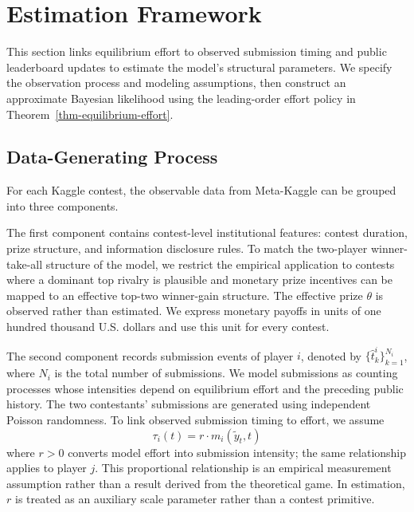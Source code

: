 \documentclass[mnsc]{informs3}
\begin{document}
\section{Estimation Framework}\label{sect-bayes-framework}

This section links equilibrium effort to observed submission timing and public leaderboard updates to estimate the model's structural parameters. We specify the observation process and modeling assumptions, then construct an approximate Bayesian likelihood using the leading-order effort policy in Theorem~\ref{thm-equilibrium-effort}.

\subsection{Data-Generating Process}

For each Kaggle contest, the observable data from Meta-Kaggle can be grouped into three components.

The first component contains contest-level institutional features: contest duration, prize structure, and information disclosure rules.
To match the two-player winner-take-all structure of the model, we restrict the empirical application to contests where a dominant top rivalry is plausible and monetary prize incentives can be mapped to an effective top-two winner-gain structure.
The effective prize $\theta$ is observed rather than estimated. We express monetary payoffs in units of one hundred thousand U.S. dollars and use this unit for every contest.

The second component records submission events of player $i$, denoted by $\{\hat{t}^i_k\}_{k=1}^{N_i}$, where $N_i$ is the total number of submissions.
We model submissions as counting processes whose intensities depend on equilibrium effort and the preceding public history. The two contestants' submissions are generated using independent Poisson randomness. To link observed submission timing to effort, we assume
\begin{equation}\label{eq-model-intensity}
{\tau_i(t) = r \cdot m_i(\tilde{y}_t,t)}
\end{equation}
where \(r>0\) converts model effort into submission intensity; the same relationship applies to player \(j\). This proportional relationship is an empirical measurement assumption rather than a result derived from the theoretical game. In estimation, \(r\) is treated as an auxiliary scale parameter rather than a contest primitive.
\end{document}
